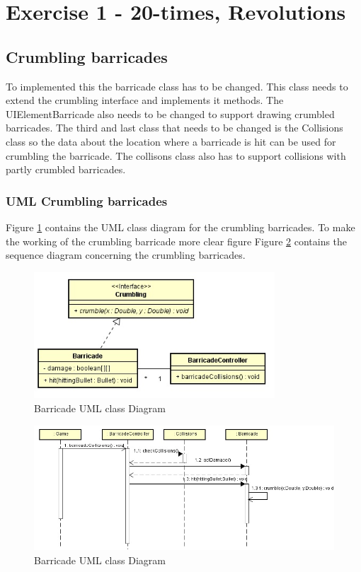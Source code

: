 \section{Exercise 1 - 20-times, Revolutions }
\subsection{Crumbling barricades }
To implemented this the barricade class has to be changed. This class needs to extend the crumbling interface and implements it methods. The UIElementBarricade also needs to be changed to support drawing crumbled barricades. The third and last class that needs to be changed is the Collisions class so the data about the location where a barricade is hit can be used for crumbling the barricade. The collisons class also has to support collisions with partly crumbled barricades.
\newpage
\subsubsection{UML Crumbling barricades}
Figure \ref{fig:1-1barricadeClass} contains the UML class diagram for the crumbling barricades.
To make the working of the crumbling barricade more clear figure Figure \ref{fig:1-1barricadeSequence} contains the sequence diagram concerning the crumbling barricades.
\begin{figure}[ht!]
\centering
\includegraphics[width=9cm]{BarricadeClass.jpg}
\caption{Barricade UML class Diagram}
\label{fig:1-1barricadeClass}
\end{figure}
\begin{figure}[ht!]
\centering
\includegraphics[width=18cm]{BarricadeSequence.jpg}
\caption{Barricade UML class Diagram}
\label{fig:1-1barricadeSequence}
\end{figure}
\newpage
